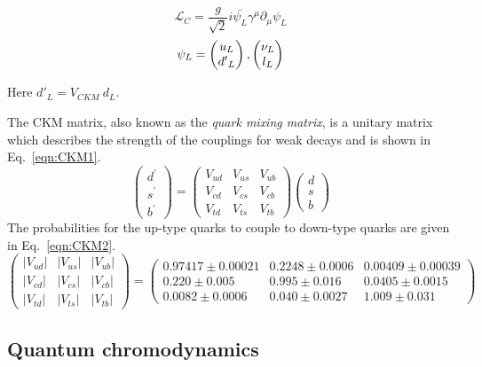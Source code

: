 \begin{equation}
\label{eqn:CCint}
\mathcal{L}_{C} = \frac{g}{\sqrt{2}} i\bar{\psi_{L}} \gamma^{\mu} \partial_{\mu} \psi_{L}
\end{equation}
\begin{equation*}
\psi_L = \begin{pmatrix} u_L \\ {d'}_L \end{pmatrix}, \begin{pmatrix} \nu_L \\ l_L \end{pmatrix}
\end{equation*}

Here ${d'}_L = V_{CKM}~d_L$.


The CKM matrix, also known as the \emph{quark mixing matrix}, is a unitary matrix which describes the strength of the couplings for weak decays and is shown in Eq.~\ref{eqn:CKM1}. 
\begin{equation}
\label{eqn:CKM1}
{\begin{pmatrix}
d^{\prime }\\
s^{\prime }\\
b^{\prime }
\end{pmatrix}}
=
{\begin{pmatrix}
V_{ud}&V_{us}&V_{ub}\\
V_{cd}&V_{cs}&V_{cb}\\
V_{td}&V_{ts}&V_{tb}
\end{pmatrix}}
{\begin{pmatrix}d\\s\\b
\end{pmatrix}}
\end{equation}
The probabilities for the up-type quarks to couple to down-type quarks are given in Eq.~\ref{eqn:CKM2}.
\begin{equation}
\label{eqn:CKM2}
{\begin{pmatrix}
|V_{ud}|&|V_{us}|&|V_{ub}|\\|V_{cd}|&|V_{cs}|&|V_{cb}|\\|V_{td}|&|V_{ts}|&|V_{tb}|
\end{pmatrix}}
=
{\begin{pmatrix}0.97417\pm 0.00021 & 0.2248\pm 0.0006 & 0.00409\pm{0.00039}\\
0.220\pm 0.005 & 0.995\pm 0.016 & 0.0405\pm{0.0015}\\
0.0082\pm{0.0006} & 0.040\pm{0.0027}&1.009\pm0.031
\end{pmatrix}}
\end{equation}



\subsection{Quantum chromodynamics}

